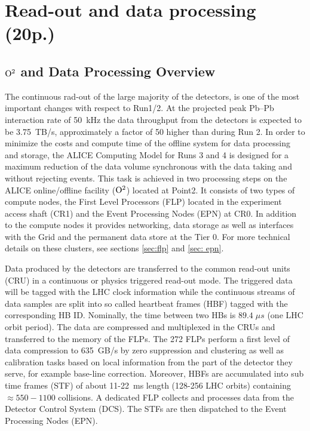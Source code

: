 \section{Read-out and data processing (20p.)}
\subsection{${\rm O}^2$ and Data Processing Overview}
The continuous rad-out of the large majority of the detectors, is one of the most important changes with respect to Run1/2.
At the projected peak Pb--Pb interaction rate of 50~kHz the data throughput from the 
detectors is expected to be 3.75~TB/s, approximately a factor of 50 higher than during Run 2.
In order to minimize the costs and compute time of the offline system for data 
processing and storage, the ALICE Computing Model for Runs 3 and 4 is designed 
for a maximum reduction of the data volume synchronous with the data taking and without rejecting events. 
This task is achieved in two processing steps on the ALICE online/offline facility (${\rm O}^2$) located at Point2. It consists of two types of compute nodes, the First Level Processors (FLP) located in the 
experiment access shaft (CR1) and the Event Processing Nodes (EPN) at CR0. In addition to the compute 
nodes it provides networking, data storage as well as interfaces with the Grid and the permanent data 
store at the Tier
0. For more technical details on these clusters, see sections \ref{sec:flp} and \ref{sec: epn}.

Data produced by the detectors are transferred to the common read-out units (CRU) in a continuous or
physics triggered read-out mode. The triggered data will be tagged with the LHC clock information while 
the continuous streams of data samples are split into so called heartbeat frames (HBF) tagged with the 
corresponding HB ID. Nominally, the time between two HBs is $89.4 \; \mu s$ (one LHC orbit period).
The data are compressed and multiplexed
in the CRUs and transferred to the memory of the FLPs.
The 272 FLPs perform a 
first level of data compression to 635~GB/s by zero suppression and clustering as well as calibration 
tasks based on local information from the part of the detector they serve, for example base-line 
correction.
Moreover, HBFs are accumulated into sub time frames (STF) of about 11-22~ms length (128-256 LHC orbits) 
containing $\approx 550-1100$ collisions. A dedicated FLP collects and processes data from the Detector 
Control System (DCS).
The STFs are then dispatched to the Event Processing Nodes (EPN). 

